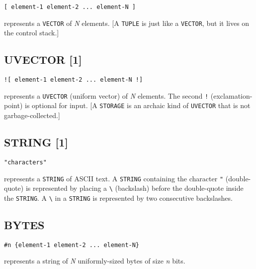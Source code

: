 \documentclass[a4paper]{scrbook}
\begin{document}
\begin{verbatim}
[ element-1 element-2 ... element-N ]
\end{verbatim}

\index{\texttt{[}|textbf} \index{\texttt{]}|textbf} represents a \texttt{VECTOR} of \emph{N}
elements. {[}A \texttt{TUPLE} is just like a \texttt{VECTOR}, but it lives on the control stack.{]}

\subsection{UVECTOR {[}1{]}}\label{uvector-1}

\begin{verbatim}
![ element-1 element-2 ... element-N !]
\end{verbatim}

\index{\texttt{"![}|textbf}\index{\texttt{"!]}|textbf} represents a \texttt{UVECTOR}
(uniform vector) of \emph{N} elements. The second \texttt{!} (exclamation-point) is optional for input. {[}A
\texttt{STORAGE} is an archaic kind of \texttt{UVECTOR} that is not garbage-collected.{]}

\subsection{STRING {[}1{]}}\label{string-1}

\begin{verbatim}
"characters"
\end{verbatim}

represents a \texttt{STRING} of ASCII text. A \texttt{STRING} containing the character
\texttt{"}  (double-quote) is represented by placing a
\texttt{\textbackslash{}} (backslash) before the double-quote inside the
\texttt{STRING}. A \texttt{\textbackslash{}} in a \texttt{STRING} is represented by two consecutive backslashes.

\subsection{BYTES}\label{bytes}

\begin{verbatim}
#n {element-1 element-2 ... element-N}
\end{verbatim}

represents a string of \emph{N} uniformly-sized bytes of size \emph{n} bits.
\end{document}
